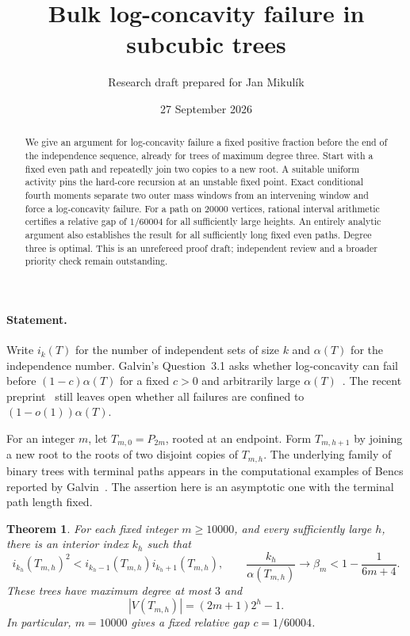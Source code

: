 \documentclass[11pt]{article}
\title{Bulk log-concavity failure in subcubic trees}
\author{Research draft prepared for Jan Mikul\'ik}
\date{27 September 2026}
\newtheorem{theorem}{Theorem}
\begin{document}
\maketitle
\begin{abstract}
We give an argument for log-concavity failure a fixed positive fraction before the end of the independence sequence, already for trees of maximum degree three. Start with a fixed even path and repeatedly join two copies to a new root. A suitable uniform activity pins the hard-core recursion at an unstable fixed point. Exact conditional fourth moments separate two outer mass windows from an intervening window and force a log-concavity failure. For a path on $20000$ vertices, rational interval arithmetic certifies a relative gap of $1/60004$ for all sufficiently large heights. An entirely analytic argument also establishes the result for all sufficiently long fixed even paths. Degree three is optimal. This is an unrefereed proof draft; independent review and a broader priority check remain outstanding.
\end{abstract}

\paragraph{Statement.}
Write $i_k(T)$ for the number of independent sets of size $k$ and $\alpha(T)$ for the independence number. Galvin's Question~3.1 asks whether log-concavity can fail before $(1-c)\alpha(T)$ for a fixed $c>0$ and arbitrarily large $\alpha(T)$~\cite{Galvin}. The recent preprint~\cite[Section 9]{Fang} still leaves open whether all failures are confined to $(1-o(1))\alpha(T)$.

For an integer $m$, let $T_{m,0}=P_{2m}$, rooted at an endpoint. Form $T_{m,h+1}$ by joining a new root to the roots of two disjoint copies of $T_{m,h}$. The underlying family of binary trees with terminal paths appears in the computational examples of Bencs reported by Galvin~\cite[Section 3]{Galvin}. The assertion here is an asymptotic one with the terminal path length fixed.

\begin{theorem}\label{thm:main}
For each fixed integer $m\ge10000$, and every sufficiently large $h$, there is an interior index $k_h$ such that
\[
 i_{k_h}(T_{m,h})^2<i_{k_h-1}(T_{m,h})i_{k_h+1}(T_{m,h}),
 \qquad \frac{k_h}{\alpha(T_{m,h})}\longrightarrow\beta_m
 <1-\frac1{6m+4}.
\]
These trees have maximum degree at most $3$ and
\[
 |V(T_{m,h})|=(2m+1)2^h-1.
\]
In particular, $m=10000$ gives a fixed relative gap $c=1/60004$.
\end{theorem}
\end{document}
